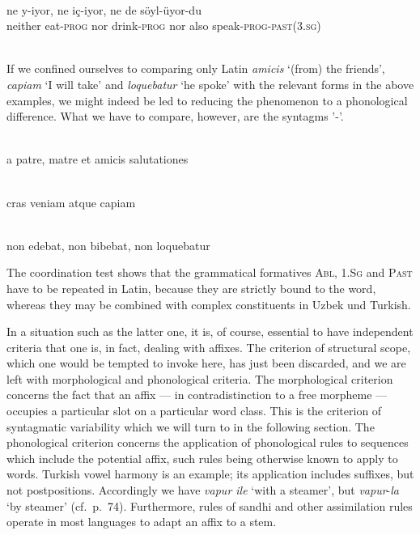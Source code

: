 \ea\label{ex:}
\langinfo{\LangTurk}{}{}\\
\gll ne  y-iyor,  ne  iç-iyor,  ne  de  söyl-üyor-du\\
 neither  eat-\textsc{prog}  nor  drink-\textsc{prog}  nor  also  speak-\textsc{prog}-\textsc{past}(3.\textsc{sg})\\
\\
\z

If we confined ourselves to comparing only Latin \textit{amicis} ‘(from) the friends’, \textit{capiam} ‘I will take’ and \textit{loquebatur} ‘he spoke’ with the relevant forms in the above examples, we might indeed be led to reducing the phenomenon to a phonological difference. What we have to compare, however, are the syntagms '-'.

\ea
{}\\
 a patre, matre et amicis salutationes\\
\z

\ea
{}\\
 cras veniam atque capiam\\
\z

\ea
{}\\
 non edebat, non bibebat, non loquebatur\\
\z

The coordination test shows that the grammatical formatives \textsc{Abl}, 1.\textsc{Sg} and \textsc{Past} have to be repeated in Latin, because they are strictly bound to the word, whereas they may be combined with complex constituents in Uzbek und Turkish.

In a situation such as the latter one, it is, of course, essential to have independent criteria that one is, in fact, dealing with affixes. The criterion of structural scope, which one would be tempted to invoke here, has just been discarded, and we are left with morphological and phonological criteria. The morphological criterion concerns the fact that an affix — in contradistinction to a free morpheme — occupies a particular slot on a particular word class. This is the criterion of syntagmatic variability which we will turn to in the following section. The phonological criterion concerns the application of phonological rules to sequences which include the potential affix, such rules being otherwise known to apply to words. Turkish vowel harmony is an example; its application includes suffixes, but not postpositions. Accordingly we have \textit{vapur ile} ‘with a steamer’, but \textit{vapur}{}-\textit{la} ‘by steamer’ (cf.~p.~74). Furthermore, rules of sandhi and other assimilation rules operate in most languages to adapt an affix to a stem.

